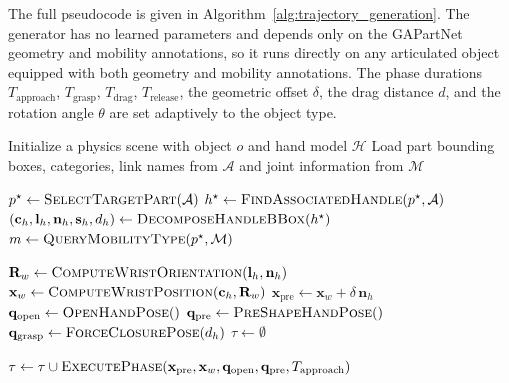 \documentclass{llmxive}
\begin{document}
The full pseudocode is given in
Algorithm~\ref{alg:trajectory_generation}. The generator has no
learned parameters and depends only
on the GAPartNet geometry and mobility annotations, so it runs
directly on any articulated object equipped with both geometry and
mobility annotations. The phase
durations $T_{\mathrm{approach}}$, $T_{\mathrm{grasp}}$,
$T_{\mathrm{drag}}$, $T_{\mathrm{release}}$, the geometric offset
$\delta$, the drag distance $d$, and the rotation angle $\theta$
are set adaptively to the object type.


\begin{algorithm}[t]
\caption{Geometry-Guided Interaction Trajectory Generation}
\label{alg:trajectory_generation}

\BlankLine
{}
Initialize a physics scene with object $o$ and hand model $\mathcal{H}$\;
Load part bounding boxes, categories, link names from $\mathcal{A}$
and joint information from $\mathcal{M}$\;

\BlankLine
{}
$p^\star \leftarrow \textsc{SelectTargetPart}(\mathcal{A})$\;
$h^\star \leftarrow \textsc{FindAssociatedHandle}(p^\star,\mathcal{A})$\;
$(\mathbf{c}_h,\mathbf{l}_h,\mathbf{n}_h,\mathbf{s}_h,d_h)
   \leftarrow \textsc{DecomposeHandleBBox}(h^\star)$\;
$m \leftarrow \textsc{QueryMobilityType}(p^\star,\mathcal{M})$\;

\BlankLine
{}
$\mathbf{R}_w \leftarrow
   \textsc{ComputeWristOrientation}(\mathbf{l}_h,\mathbf{n}_h)$\;
$\mathbf{x}_w \leftarrow
   \textsc{ComputeWristPosition}(\mathbf{c}_h,\mathbf{R}_w)$\;
$\mathbf{x}_{\mathrm{pre}} \leftarrow
   \mathbf{x}_w + \delta\, \mathbf{n}_h$\;
$\mathbf{q}_{\mathrm{open}}  \leftarrow \textsc{OpenHandPose}()$\;
$\mathbf{q}_{\mathrm{pre}}   \leftarrow \textsc{PreShapeHandPose}()$\;
$\mathbf{q}_{\mathrm{grasp}} \leftarrow
   \textsc{ForceClosurePose}(d_h)$\;
$\tau \leftarrow \emptyset$\;

\BlankLine
{}
$\tau \leftarrow \tau \cup
   \textsc{ExecutePhase}(\mathbf{x}_{\mathrm{pre}},\mathbf{x}_w,
   \mathbf{q}_{\mathrm{open}},\mathbf{q}_{\mathrm{pre}},
   T_{\mathrm{approach}})$\;


\end{algorithm}
\end{document}
